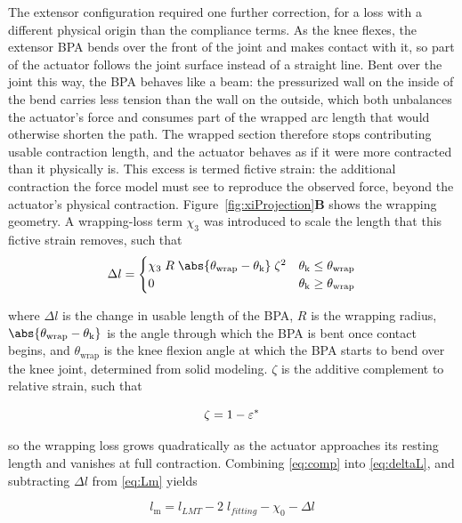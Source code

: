 The extensor configuration required one further correction, for a loss with a different physical origin than the compliance terms. As the knee flexes, the extensor BPA bends over the front of the joint and makes contact with it, so part of the actuator follows the joint surface instead of a straight line. Bent over the joint this way, the BPA behaves like a beam: the pressurized wall on the inside of the bend carries less tension than the wall on the outside, which both unbalances the actuator's force and consumes part of the wrapped arc length that would otherwise shorten the path. The wrapped section therefore stops contributing usable contraction length, and the actuator behaves as if it were more contracted than it physically is. This excess is termed fictive strain: the additional contraction the force model must see to reproduce the observed force, beyond the actuator's physical contraction. Figure~\ref{fig:xiProjection}\textbf{B} shows the wrapping geometry. A wrapping-loss term $\chi_{3}$ was introduced to scale the length that this fictive strain removes, such that
\begin{equation}
    \Delta l = \begin{cases}
     \chi_{3}\;R\;\abs{ \theta_\text{wrap}-\theta_\text{k}}\;\zeta^2 & \theta_\text{k} \leq      \theta_\text{wrap} \\
      0 & \theta_\text{k} \geq \theta_\text{wrap}
     \end{cases}\label{eq:deltaL}
\end{equation}

where $\Delta l$ is the change in usable length of the BPA, $R$ is the wrapping radius, $\abs{\theta_\text{wrap}-\theta_\text{k}}$ is the angle through which the BPA is bent once contact begins, and $\theta_\text{wrap}$ is the knee flexion angle at which the BPA starts to bend over the knee joint, determined from solid modeling. $\zeta$ is the additive complement to relative strain, such that

\begin{equation}
    \zeta = 1-\varepsilon^*  \\
\label{eq:comp}
\end{equation}

so the wrapping loss grows quadratically as the actuator approaches its resting length and vanishes at full contraction. Combining \eqref{eq:comp} into \eqref{eq:deltaL}, and subtracting $\Delta l$ from  \eqref{eq:Lm} yields

\begin{equation}
    l_\text{m} = l_{LMT} - 2\;l_{fitting}  - \chi_{0} - \Delta l\label{eq:x3}
\end{equation}

